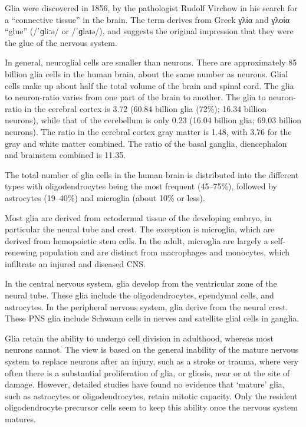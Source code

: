 Glia were discovered in 1856, by the pathologist Rudolf Virchow in his search for a ``connective tissue'' in the brain. The term derives from Greek γλία and γλοία ``glue'' (/ˈɡliːə/ or /ˈɡlaɪə/), and suggests the original impression that they were the glue of the nervous system.

In general, neuroglial cells are smaller than neurons. There are approximately 85 billion glia cells in the human brain, about the same number as neurons. Glial cells make up about half the total volume of the brain and spinal cord. The glia to neuron-ratio varies from one part of the brain to another. The glia to neuron-ratio in the cerebral cortex is 3.72 (60.84 billion glia (72\%); 16.34 billion neurons), while that of the cerebellum is only 0.23 (16.04 billion glia; 69.03 billion neurons). The ratio in the cerebral cortex gray matter is 1.48, with 3.76 for the gray and white matter combined. The ratio of the basal ganglia, diencephalon and brainstem combined is 11.35.

The total number of glia cells in the human brain is distributed into the different types with oligodendrocytes being the most frequent (45--75\%), followed by astrocytes (19--40\%) and microglia (about 10\% or less).

Most glia are derived from ectodermal tissue of the developing embryo, in particular the neural tube and crest. The exception is microglia, which are derived from hemopoietic stem cells. In the adult, microglia are largely a self-renewing population and are distinct from macrophages and monocytes, which infiltrate an injured and diseased CNS.

In the central nervous system, glia develop from the ventricular zone of the neural tube. These glia include the oligodendrocytes, ependymal cells, and astrocytes. In the peripheral nervous system, glia derive from the neural crest. These PNS glia include Schwann cells in nerves and satellite glial cells in ganglia.

Glia retain the ability to undergo cell division in adulthood, whereas most neurons cannot. The view is based on the general inability of the mature nervous system to replace neurons after an injury, such as a stroke or trauma, where very often there is a substantial proliferation of glia, or gliosis, near or at the site of damage. However, detailed studies have found no evidence that `mature' glia, such as astrocytes or oligodendrocytes, retain mitotic capacity. Only the resident oligodendrocyte precursor cells seem to keep this ability once the nervous system matures.

